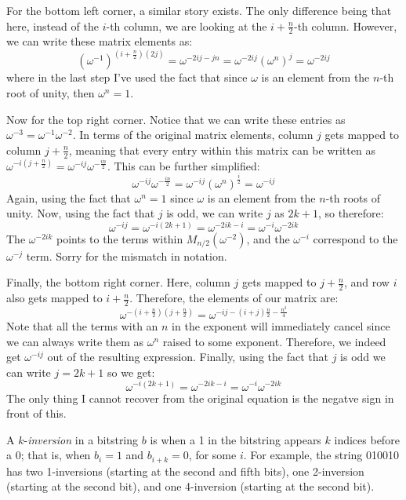 \documentclass[11pt]{article}
\begin{document}
\begin{enumerate}[label=(\alph*), resume]
\begin{solution}
	For the bottom left corner, a similar story exists. The only difference being that here, instead of 
	the $i$-th column, we are looking at the $i + \frac{n}{2}$-th column. However, we can write these
	matrix elements as:
	\[
		(\omega^{-1})^{\left( i + \frac{n}{2} \right) (2j)} = \omega^{-2ij - jn} = \omega^{-2ij} (\omega^{n})^j
		= \omega^{-2ij}
	\] 
	where in the last step I've used the fact that since $\omega$ is an element from the $n$-th root 
	of unity, then $\omega^n = 1$. 

	Now for the top right corner. Notice that we can write these entries as $\omega^{-3} = \omega^{-1}
	\omega^{-2}$. In terms of the original matrix elements, column $j$ gets mapped to column $j + 
	\frac{n}{2}$, meaning that every entry within this matrix can be written as 
	$\omega^{-i\left(j + \frac{n}{2}\right)} = \omega^{-ij} \omega^{-\frac{in}{2}}$. This can be further 
	simplified:
	\[
		\omega^{-ij} \omega^{-\frac{in}{2}} = \omega^{-ij} (\omega^{n})^{\frac{i}{2}} = \omega^{-ij}
	\] 
	Again, using the fact that $\omega^n = 1$ since $\omega$ is an element from the $n$-th roots of unity.
	Now, using the fact that $j$ is odd, we can write $j$ as $2k +1$, so therefore:
	\[
		\omega^{-ij} = \omega^{-i(2k + 1)} = \omega^{-2ik - i} = \omega^{-i} \omega^{-2ik}
	\] 
	The $\omega^{-2ik}$ points to the terms within $M_{n / 2}(\omega^{-2})$, and the $\omega^{-i}$ correspond
	to the $\omega^{-j}$ term. Sorry for the mismatch in notation. 
	
	Finally, the bottom right corner. Here, column $j$ gets mapped to $j + \frac{n}{2}$, and row $i$ also 
	gets mapped to $i + \frac{n}{2}$. Therefore, the elements of our matrix are:
	\[
		\omega^{-(i + \frac{n}{2})(j + \frac{n}{2})} = \omega^{-ij - (i+j)\frac{n}{2} - \frac{n^2}{4}}
	\] 
	Note that all the terms with an $n$ in the exponent will immediately cancel since we can always write 
	them as $\omega^n$ raised to some exponent. Therefore, we indeed get $\omega^{-ij}$ out of the 
	resulting expression. Finally, using the fact that $j$ is odd we can write $j = 2k + 1$ so we get:
	\[
		\omega^{-i(2k + 1)} = \omega^{-2ik - i} = \omega^{-i} \omega^{-2ik}
	\] 
	The only thing I cannot recover from the original equation is the negatve sign in front of this.
\end{solution}
\end{enumerate}
\pagebreak
{}
A $k$-\textit{inversion} in a bitstring $b$ is when a 1 in the bitstring appears $k$ indices before a 0; that is, when $b_i=1$ and $b_{i+k}=0$, for some $i$. For example, the string 010010 has two 1-inversions (starting at the second and fifth bits), one 2-inversion (starting at the second bit), and one 4-inversion (starting at the second bit).
\end{document}
